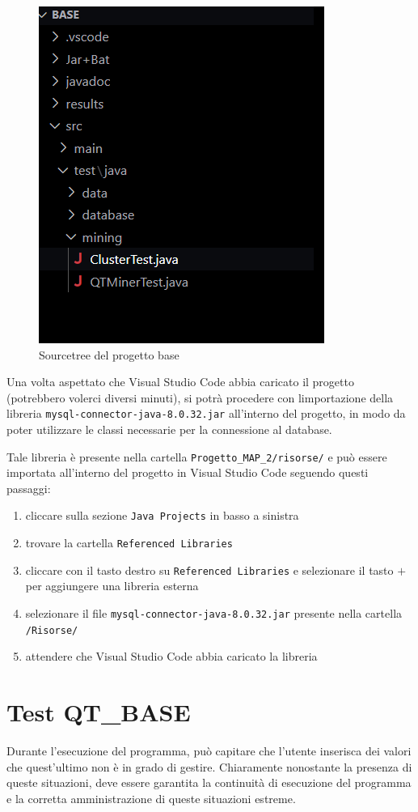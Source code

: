 \begin{figure}[h!]
    \centering
    \includegraphics[width = 0.35 \textwidth]{images/albero cartelle.png}
    \caption{Sourcetree del progetto base}
\end{figure}
Una volta aspettato che Visual Studio Code abbia caricato il progetto (potrebbero volerci diversi minuti), si potrà procedere con limportazione della libreria \texttt{mysql-connector-java-8.0.32.jar} all'interno del progetto, in modo da poter utilizzare le classi necessarie per la connessione al database.

Tale libreria è presente nella cartella \texttt{Progetto\_MAP\_2/risorse/} e può essere importata all'interno del progetto in Visual Studio Code seguendo questi passaggi:

\begin{enumerate}
    \item cliccare sulla sezione \texttt{Java Projects} in basso a sinistra
    \item trovare la cartella \texttt{Referenced Libraries}
    \item cliccare con il tasto destro su \texttt{Referenced Libraries} e selezionare il tasto $+$ per aggiungere una libreria esterna
    \item selezionare il file \texttt{mysql-connector-java-8.0.32.jar} presente nella cartella \texttt{/Risorse/}
    \item attendere che Visual Studio Code abbia caricato la libreria
\end{enumerate}
\section{Test QT\_BASE}

Durante l'esecuzione del programma, può capitare che l'utente inserisca dei valori che quest'ultimo non è in grado di gestire. Chiaramente nonostante la presenza di queste situazioni, deve essere garantita la continuità di esecuzione del programma e la corretta amministrazione di queste situazioni estreme.

